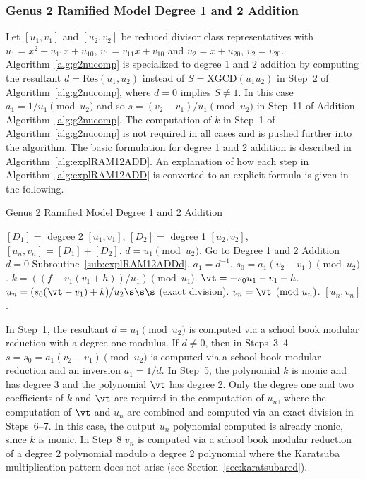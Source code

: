 \subsubsection{Genus 2 Ramified Model Degree 1 and 2 Addition}
Let $[u_1,v_1]$ and $[u_2,v_2]$ be reduced divisor class representatives with
$u_1 = x^2 + u_{11}x + u_{10}$, $v_1 = v_{11}x + v_{10}$ and $u_2 = x + u_{20}$,
$v_2 = v_{20}$. Algorithm~\ref{alg:g2nucomp}  is specialized to
degree 1 and 2 addition by computing the resultant $d = \mathrm{Res}(u_1,u_2)$
instead of $S = \mathrm{XGCD}(u_1 u_2)$ in Step~2 of
Algorithm~\ref{alg:g2nucomp}, where $d=0$ implies $S \neq 1$. In this case $a_1
= 1/u_1 \pmod{u_2}$ and so $s = (v_2 - v_1)/u_1 \pmod{u_2}$ in Step~11 of
Addition Algorithm~\ref{alg:g2nucomp}. The computation of $k$ in Step~1 of
Algorithm~\ref{alg:g2nucomp} is not required in all cases and is pushed further
into the algorithm. The basic formulation for degree 1 and 2 addition is
described in Algorithm~\ref{alg:explRAM12ADD}. An explanation of how each step
in Algorithm~\ref{alg:explRAM12ADD} is converted to an explicit formula is given
in the following.

\begin{algorithm}[htbp]
\caption{Genus 2 Ramified Model Degree 1 and 2 Addition\label{alg:explRAM12ADD}}
\begin{algorithmic} [1]
\Require $[D_1] = $ degree 2 $[u_1,v_1]$, $[D_2] = $ degree 1 $ [u_2,v_2]$, \smallskip
\Ensure $[u_n,v_n] = [D_1] + [D_2] $.
\algrule
\State $d = u_1 \pmod{u_2}$.
 \hspace{1pt} Go to Degree 1 and 2 Addition $d=0$ Subroutine~\ref{sub:explRAM12ADDd}.
\EndIf
\State $a_1 = d^{-1}$.
\State $s_0 = a_1(v_2 - v_1) \pmod{u_2}$.
\State $k = ((f - v_1(v_1 + h))/u_1) \pmod{u_1}$.
\State $\vt = -s_0u_1 - v_1 - h$.
\State $u_n = (s_0(\vt - v_1) + k)/u_2 \s\s\s$ (exact division).
\State $v_n = \vt \pmod{u_n}$.
\State \Return $[u_n,v_n]$.
\end{algorithmic}
\end{algorithm}

In Step~1, the resultant $d = u_1 \pmod{u_2}$ is computed via a school book
modular reduction with a degree one modulus. If $d \neq 0$, then in Steps~3--4
$s = s_0 = a_1(v_2 - v_1) \pmod{u_2}$ is computed via a school book modular
reduction and an inversion $a_1 = 1/d$. In Step~5, the polynomial $k$ is monic
and has degree 3 and the polynomial $\vt$ has degree 2. Only the degree one and two
coefficients of $k$ and $\vt$ are required in the computation of $u_n$, where
the computation of $\vt$ and $u_n$ are combined and computed via an exact
division in Steps~6--7. In this case, the output $u_n$ polynomial computed is
already monic, since $k$ is monic. In Step~8 $v_n$ is computed via a school book
modular reduction of a degree 2 polynomial modulo a degree 2 polynomial where
the Karatsuba multiplication pattern does not arise (see
Section~\ref{sec:karatsubared}).


